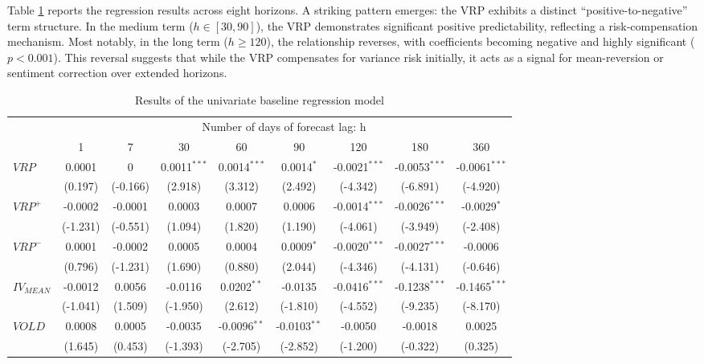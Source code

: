 \documentclass[a4paper, 12pt]{article}    %
\begin{document}
Table \ref{result1} reports the regression results across eight horizons. A striking pattern emerges: the VRP exhibits a distinct ``positive-to-negative'' term structure. In the medium term ($h \in [30, 90]$), the VRP demonstrates significant positive predictability, reflecting a risk-compensation mechanism. Most notably, in the long term ($h \ge 120$), the relationship reverses, with coefficients becoming negative and highly significant ($p < 0.001$). This reversal suggests that while the VRP compensates for variance risk initially, it acts as a signal for mean-reversion or sentiment correction over extended horizons.


    
\begin{table}[htbp]
\centering
\footnotesize %
\caption{Results of the univariate baseline regression model}
\label{result1}
\renewcommand{\arraystretch}{1.3} %
\begin{tabular}{lcccccccc}
\toprule
&\multicolumn{8}{c}{Number of days of forecast lag: h}\\
\cmidrule(lr){2-9}
& 1    & 7    & 30   &  60  & 90   & 120  & 180  & 360 \\
\midrule
$VRP$ &0.0001 & 0 & 0.0011$^{***}$ & 0.0014$^{***}$ & 0.0014$^{*}$ & -0.0021$^{***}$ & -0.0053$^{***}$ & -0.0061$^{***}$  \\
&(0.197) & (-0.166) & (2.918) & (3.312) & (2.492) & (-4.342) & (-6.891) & (-4.920) \\
$VRP^+$ &-0.0002 & -0.0001 & 0.0003 & 0.0007 & 0.0006 & -0.0014$^{***}$ & -0.0026$^{***}$ & -0.0029$^{*}$  \\
&(-1.231) & (-0.551) & (1.094) & (1.820) & (1.190) & (-4.061) & (-3.949) & (-2.408) \\
$VRP^-$ &0.0001 & -0.0002 & 0.0005 & 0.0004 & 0.0009$^{*}$ & -0.0020$^{***}$ & -0.0027$^{***}$ & -0.0006  \\
&(0.796) & (-1.231) & (1.690) & (0.880) & (2.044) & (-4.346) & (-4.131) & (-0.646) \\
$IV_{MEAN}$ &-0.0012 & 0.0056 & -0.0116 & 0.0202$^{**}$ & -0.0135 & -0.0416$^{***}$ & -0.1238$^{***}$ & -0.1465$^{***}$  \\
&(-1.041) & (1.509) & (-1.950) & (2.612) & (-1.810) & (-4.552) & (-9.235) & (-8.170) \\
$VOLD$ &0.0008 & 0.0005 & -0.0035 & -0.0096$^{**}$ & -0.0103$^{**}$ & -0.0050 & -0.0018 & 0.0025  \\
&(1.645) & (0.453) & (-1.393) & (-2.705) & (-2.852) & (-1.200) & (-0.322) & (0.325) \\

\end{tabular}
\end{table}
\end{document}
